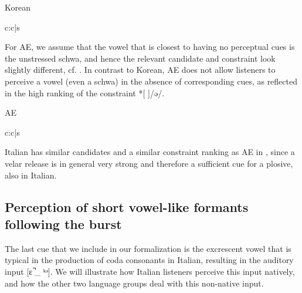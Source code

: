 \documentclass[output=paper,colorlinks,citecolor=brown]{langscibook}
\begin{document}
\begin{table}
\caption{Korean}
\label{hamann:tabk2}
\ShadingOff
\begin{tableau}{c:c|s}
\inp{[ɛ˺\_ ᵏ]}                        \const*{*[ᵏ]/ /}                                       
                         \vio{}          \vio{*!}           \vio{}
   \vio{}          \vio{}            \vio{*}
                          \vio{*!}        \vio{}            \vio{}
\end{tableau}
\end{table}



For AE, we assume that the vowel that is closest to having no perceptual cues is the unstressed schwa, and hence the relevant candidate and constraint look slightly different, cf. . In contrast to Korean, AE does not allow listeners to perceive a vowel (even a schwa) in the absence of corresponding cues, as reflected in the high ranking of the constraint *[ ]/ə/.

\begin{table}
\caption{AE}
\label{hamann:tabae1}
\ShadingOff
\begin{tableau}{c:c|s}
\inp{[ɛ˺\_ᵏ]}      \const*{*[ᵏ]/ /}     
   \vio{}          \vio{}         \vio{*}
 \vio{}          \vio{*!}           \vio{}
              \vio{*!}        \vio{}           \vio{}
\end{tableau}
\end{table}


Italian has similar candidates and a similar constraint ranking as AE in , since a velar release is in general very strong
\citep{Dormanetal1977} and therefore a sufficient cue for a plosive, also in Italian. 


\subsection{Perception of short vowel-like formants following the burst}\label{hamann:schwa}

The last cue that we include in our formalization is the excrescent vowel that is typical in the production of coda consonants in Italian, resulting in the auditory input [ɛ  ̚\_ ᵏᵊ]. We will illustrate how Italian listeners perceive this input natively, and how the other two language groups deal with this non-native input.
\end{document}
